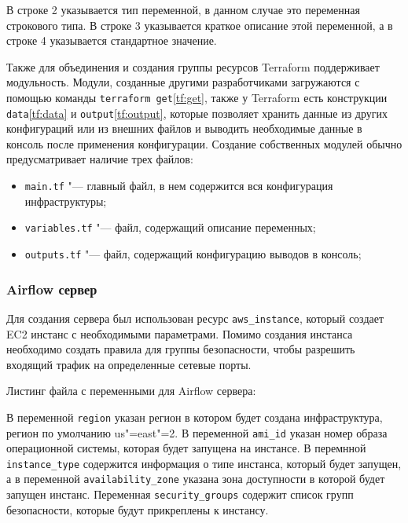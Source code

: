 \documentclass[bachelor, och, pract]{SCWorks}
\begin{document}


В строке 2 указывается тип переменной, в данном случае это переменная строкового типа. В строке 3 указывается краткое описание этой переменной, а в строке 4 указывается стандартное значение.

Также для объединения и создания группы ресурсов Terraform поддерживает модульность. Модули, созданные другими разработчиками загружаются с помощью команды \verb|terraform get|\ref{tf:get}, также у Terraform есть конструкции \verb|data|\ref{tf:data} и \verb|output|\ref{tf:output}, которые позволяет хранить данные из других конфигураций или из внешних файлов и выводить необходимые данные в консоль после применения конфигурации.
Создание собственных модулей обычно предусматривает наличие трех файлов:
\begin{itemize}
	\item \verb|main.tf| "--- главный файл, в нем содержится вся конфигурация инфраструктуры;
	\item \verb|variables.tf| "--- файл, содержащий описание переменных;
	\item \verb|outputs.tf| "--- файл, содержащий конфигурацию выводов в консоль;
\end{itemize}
\subsubsection{Airflow сервер}
Для создания сервера был использован ресурс \verb|aws_instance|, который создает EC2 инстанс с необходимыми параметрами. Помимо создания инстанса необходимо создать правила для группы безопасности, чтобы разрешить входящий трафик на определенные сетевые порты. 

Листинг файла с переменными для Airflow сервера:


В переменной \verb|region| указан регион в котором будет создана инфраструктура, регион по умолчанию us"=east"=2. В переменной \verb|ami_id| указан номер образа операционной системы, которая будет запущена на инстансе. В перемнной \verb|instance_type| содержится информация о типе инстанса, который будет запущен, а в переменной \verb|availability_zone| указана зона доступности в которой будет запущен инстанс. Переменная \verb|security_groups| содержит список групп безопасности, которые будут прикреплены к инстансу.
\end{document}
